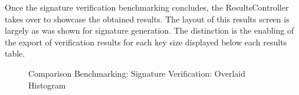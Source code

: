 \documentclass[]{final_report}
\theoremstyle{definition}
\begin{document}
Once the signature verification benchmarking concludes, the ResultsController takes over to showcase the obtained results. The layout of this results screen is largely as was shown for signature generation. The distinction is the enabling of the export of verification results for each key size displayed below each results table.

\begin{figure}[H]
    \centering %
    
    \begin{minipage}{0.7\textwidth}
        \centering
        \caption{Comparison Benchmarking: Signature Verification: Overlaid Histogram}
        \label{fig:image1}
    \end{minipage}
    \hfill %
    \begin{minipage}{0.7\textwidth}
        \centering

\end{minipage}
\end{figure}
\end{document}

